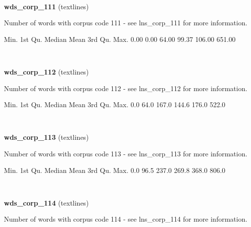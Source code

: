\documentclass[]{article}
\newenvironment{Shaded}{\begin{snugshade}}{\end{snugshade}}
\newcommand{\FloatTok}[1]{\textcolor[rgb]{0.00,0.00,0.81}{{#1}}}
\newcommand{\NormalTok}[1]{{#1}}
\begin{document}
~

\vspace{1em}

\textbf{wds\_corp\_111} (textlines)

Number of words with corpus code 111 - see lns\_corp\_111 for more
information.

\begin{Shaded}
\begin{Highlighting}[]
   \NormalTok{Min. 1st Qu.  Median    Mean 3rd Qu.    Max. }
   \FloatTok{0.00}    \FloatTok{0.00}   \FloatTok{64.00}   \FloatTok{99.37}  \FloatTok{106.00}  \FloatTok{651.00} 
\end{Highlighting}
\end{Shaded}

~

\vspace{1em}

\textbf{wds\_corp\_112} (textlines)

Number of words with corpus code 112 - see lns\_corp\_112 for more
information.

\begin{Shaded}
\begin{Highlighting}[]
   \NormalTok{Min. 1st Qu.  Median    Mean 3rd Qu.    Max. }
    \FloatTok{0.0}    \FloatTok{64.0}   \FloatTok{167.0}   \FloatTok{144.6}   \FloatTok{176.0}   \FloatTok{522.0} 
\end{Highlighting}
\end{Shaded}

~

\vspace{1em}

\textbf{wds\_corp\_113} (textlines)

Number of words with corpus code 113 - see lns\_corp\_113 for more
information.

\begin{Shaded}
\begin{Highlighting}[]
   \NormalTok{Min. 1st Qu.  Median    Mean 3rd Qu.    Max. }
    \FloatTok{0.0}    \FloatTok{96.5}   \FloatTok{237.0}   \FloatTok{269.8}   \FloatTok{368.0}   \FloatTok{806.0} 
\end{Highlighting}
\end{Shaded}

~

\vspace{1em}

\textbf{wds\_corp\_114} (textlines)

Number of words with corpus code 114 - see lns\_corp\_114 for more
information.
\end{document}
